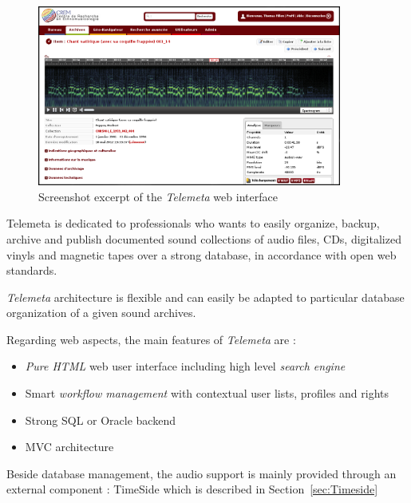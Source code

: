 \documentclass[runningheads,a4paper]{llncs}
\begin{document}
\begin{figure}[htbp]
  \centering
  \includegraphics[width=10cm]{img/telemeta.png}
  \caption{Screenshot excerpt of the \emph{Telemeta} web interface}\label{fig:Telemeta}
\end{figure}

Telemeta is dedicated to professionals who wants to easily organize, backup, archive and publish documented sound collections of audio files, CDs, digitalized vinyls and magnetic tapes over a strong database, in accordance with open web standards. 


\emph{Telemeta} architecture is flexible and can easily be adapted to particular database organization of a given sound archives. 

Regarding web aspects, the main features of \emph{Telemeta} are :
\begin{itemize}
\item \emph{Pure HTML} web user interface including high level \emph{search engine}
\item Smart \emph{workflow management} with contextual user lists, profiles and rights
\item Strong SQL or Oracle backend
\item MVC architecture 
\end{itemize}

  

Beside database management, the audio support is mainly provided through an external component : TimeSide which is described in Section~\ref{sec:Timeside}
\end{document}
